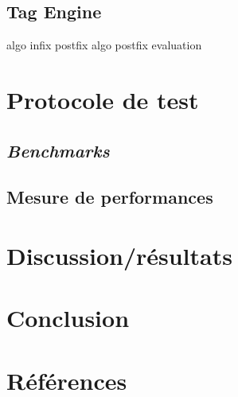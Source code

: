 \documentclass[a4paper, 12pt]{article}
\begin{document}
\subsection{Tag Engine}\label{tag_engine_realisation}
\cite{ref26}
algo infix postfix \cite{ref40}
algo postfix evaluation \cite{ref41}
\newpage

\section{Protocole de test} %
\subsection{\textit{Benchmarks}}
\subsection{Mesure de performances}
\newpage

\section{Discussion/résultats} %

\newpage

\section{Conclusion} %


\newpage
\section{Références} %


\end{document}

